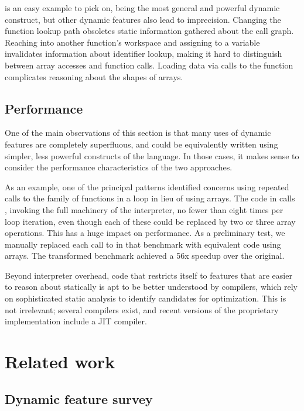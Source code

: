  is an easy example to pick on, being the most general and powerful
dynamic construct, but other dynamic features also lead to imprecision.
Changing the function lookup path obsoletes static information gathered about
the call graph. Reaching into another function's workspace and assigning to a
variable invalidates information about identifier lookup, making it hard to
distinguish between array accesses and function calls. Loading data via calls
to the  function complicates reasoning about the shapes of arrays.

\subsection{Performance}

One of the main observations of this section is that many uses of dynamic
features are completely superfluous, and could be equivalently written using
simpler, less powerful constructs of the language. In those cases, it makes
sense to consider the performance characteristics of the two approaches.

As an example, one of the principal patterns identified concerns using repeated
calls to the  family of functions in a loop in lieu of using arrays.
The code in  calls , invoking the full
machinery of the interpreter, no fewer than eight times per loop iteration,
even though each of these could be replaced by two or three array operations.
This has a huge impact on performance. As a preliminary test, we manually
replaced each call to  in that benchmark with equivalent code using
arrays. The transformed benchmark achieved a 56x speedup over the original.

Beyond interpreter overhead, code that restricts itself to features that are
easier to reason about statically is apt to be better understood by compilers,
which rely on sophisticated static analysis to identify candidates for
optimization. This is not irrelevant; several \matlab compilers exist, and
recent versions of the proprietary \matlab implementation include a JIT
compiler. %

\section{Related work}

\subsection{Dynamic feature survey}


